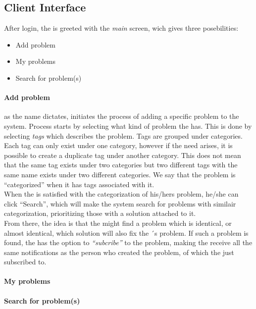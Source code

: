 \subsection{Client Interface}
\label{sec:client_interface}

After login, the \aclient[] is greeted with the \textit{main} screen, wich gives three posebilities:
\begin{itemize}
	\item Add problem
	\item My problems
	\item Search for problem(s)
\end{itemize}

\paragraph{Add problem} as the name dictates, initiates the process of adding a specific problem to the system. Process starts by selecting what kind of problem the \aclient[] has. This is done by selecting \textit{tags} which describes the problem. Tags are grouped under categories. Each tag can only exist under one category, however if the need arises, it is possible to create a duplicate tag under another category. This does not mean that the same tag exists under two categories but two different tags with the same name exists under two different categories. We say that the problem is ``categorized'' when it has tags associated with it.\\
When the \aclient[] is satisfied with the categorization of his/hers problem, he/she can click ``Search'', which will make the system search for problems with similair categorization, prioritizing those with a solution attached to it.\\
From there, the idea is that the \aclient[] might find a problem which is identical, or almost identical, which solution will also fix the \aclient ´s problem. If such a problem is found, the \aclient[] has the option to \textit{``subcribe''} to the problem, making the \aclient[] receive all the same notifications as the person who created the problem, of which the \aclient[] just subscribed to.
\paragraph{My problems}
\paragraph{Search for problem(s)}



